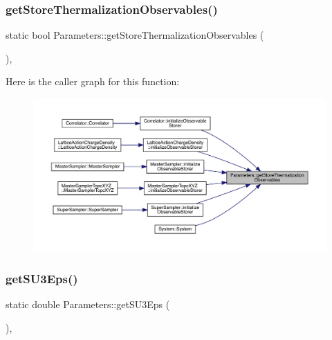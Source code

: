 \subsubsection{\texorpdfstring{getStoreThermalizationObservables()}{getStoreThermalizationObservables()}}
{\footnotesize\ttfamily static bool Parameters\+::get\+Store\+Thermalization\+Observables (\begin{DoxyParamCaption}{ }\end{DoxyParamCaption})\hspace{0.3cm}{\ttfamily [inline]}, {\ttfamily [static]}}

Here is the caller graph for this function\+:
\nopagebreak
\begin{figure}[H]
\begin{center}
\leavevmode
\includegraphics[width=350pt]{class_parameters_a216f85b3c5980a33f8a54c42fb3575c7_icgraph}
\end{center}
\end{figure}
\mbox{\label{class_parameters_ac14d1b11099fdfa254fb138d4471ceb2}} 
\subsubsection{\texorpdfstring{getSU3Eps()}{getSU3Eps()}}
{\footnotesize\ttfamily static double Parameters\+::get\+S\+U3\+Eps (\begin{DoxyParamCaption}{ }\end{DoxyParamCaption})\hspace{0.3cm}{\ttfamily [inline]}, {\ttfamily [static]}}

